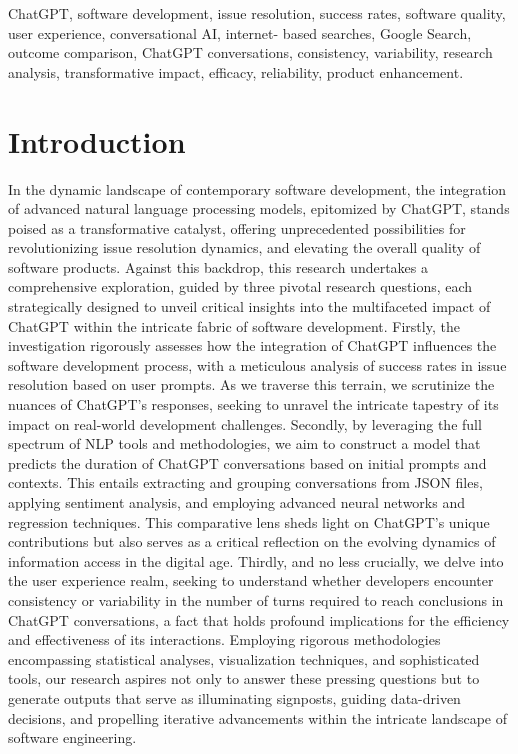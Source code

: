 \documentclass[journal]{IEEEtran}
\begin{document}
\begin{IEEEkeywords}
ChatGPT, software development, issue resolution, success rates, software quality, user experience, conversational AI, internet- based searches, Google Search, outcome comparison, ChatGPT conversations, consistency, variability, research analysis, transformative impact, efficacy, reliability, product enhancement.
\end{IEEEkeywords}

\IEEEpeerreviewmaketitle



\section{Introduction}

In the dynamic landscape of contemporary software development, the integration of advanced natural language processing models, epitomized by ChatGPT, stands poised as a transformative catalyst, offering unprecedented possibilities for revolutionizing issue resolution dynamics, and elevating the overall quality of software products. Against this backdrop, this research undertakes a comprehensive exploration, guided by three pivotal research questions, each strategically designed to unveil critical insights into the multifaceted impact of ChatGPT within the intricate fabric of software development. Firstly, the investigation rigorously assesses how the integration of ChatGPT influences the software development process, with a meticulous analysis of success rates in issue resolution based on user prompts. As we traverse this terrain, we scrutinize the nuances of ChatGPT's responses, seeking to unravel the intricate tapestry of its impact on real-world development challenges. Secondly, by leveraging the full spectrum of NLP tools and methodologies, we aim to construct a model that predicts the duration of ChatGPT conversations based on initial prompts and contexts. This entails extracting and grouping conversations from JSON files, applying sentiment analysis, and employing advanced neural networks and regression techniques. This comparative lens sheds light on ChatGPT's unique contributions but also serves as a critical reflection on the evolving dynamics of information access in the digital age. Thirdly, and no less crucially, we delve into the user experience realm, seeking to understand whether developers encounter consistency or variability in the number of turns required to reach conclusions in ChatGPT conversations, a fact that holds profound implications for the efficiency and effectiveness of its interactions. Employing rigorous methodologies encompassing statistical analyses, visualization techniques, and sophisticated tools, our research aspires not only to answer these pressing questions but to generate outputs that serve as illuminating signposts, guiding data-driven decisions, and propelling iterative advancements within the intricate landscape of software engineering. \\
\end{document}
